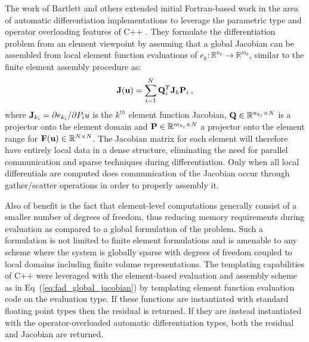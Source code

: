 The work of Bartlett and others \citep{bartlett_automatic_2006}
extended initial Fortran-based work in the area of automatic
differentiation implementations to leverage the parametric type and
operator overloading features of C++ \citep{stroustrup_c++_1997}. They
formulate the differentiation problem from an element viewpoint by
assuming that a global Jacobian can be assembled from local element
function evaluations of $e_k : \mathbb{R}^{n_k} \rightarrow
\mathbb{R}^{m_k}$, similar to the finite element assembly procedure
as:
\begin{equation}
  \mathbf{J}(\mathbf{u}) = \sum_{i=1}^N \mathbf{Q}^T_i \mathbf{J}_k \mathbf{P}_i\:,
  \label{eq:fad_global_jacobian}
\end{equation}
where $\mathbf{J}_{k_i} = \partial e_{k_i} / \partial P_i u$ is the
$k^{th}$ element function Jacobian, $\mathbf{Q} \in \mathbb{R}^{n_{k_i}
  \times N}$ is a projector onto the element domain and $\mathbf{P} \in
\mathbb{R}^{m_{k_i} \times N}$ a projector onto the element range for
$\mathbf{F}(\mathbf{u}) \in \mathbb{R}^{N \times N}$. The Jacobian matrix for
each element will therefore have entirely local data in a dense
structure, eliminating the need for parallel communication and sparse
techniques during differentiation. Only when all local differentials
are computed does communication of the Jacobian occur through
gather/scatter operations in order to properly assembly it. 

Also of benefit is the fact that element-level computations generally
consist of a smaller number of degrees of freedom, thus reducing
memory requirements during evaluation as compared to a global
formulation of the problem. Such a formulation is not limited to
finite element formulations and is amenable to any scheme where the
system is globally sparse with degrees of freedom coupled to local
domains including finite volume representations. The templating
capabilities of C++ were leveraged with the element-based evaluation
and assembly scheme as in Eq~(\ref{eq:fad_global_jacobian}) by
templating element function evaluation code on the evaluation type. If
these functions are instantiated with standard floating point types
then the residual is returned. If they are instead instantiated with
the operator-overloaded automatic differentiation types, both the
residual and Jacobian are returned.

